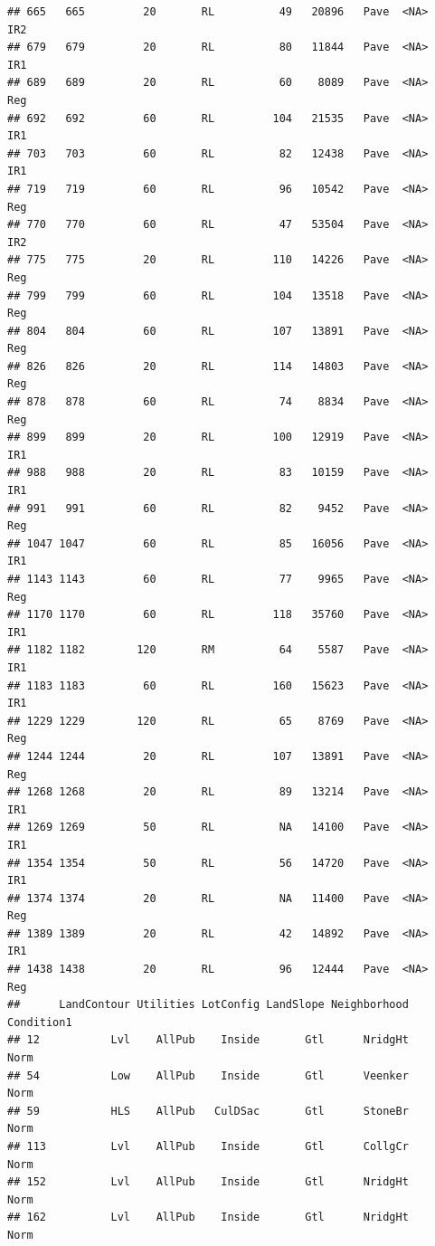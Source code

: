 \documentclass[]{article}
\begin{document}
\begin{verbatim}
## 665   665         20       RL          49   20896   Pave  <NA>      IR2
## 679   679         20       RL          80   11844   Pave  <NA>      IR1
## 689   689         20       RL          60    8089   Pave  <NA>      Reg
## 692   692         60       RL         104   21535   Pave  <NA>      IR1
## 703   703         60       RL          82   12438   Pave  <NA>      IR1
## 719   719         60       RL          96   10542   Pave  <NA>      Reg
## 770   770         60       RL          47   53504   Pave  <NA>      IR2
## 775   775         20       RL         110   14226   Pave  <NA>      Reg
## 799   799         60       RL         104   13518   Pave  <NA>      Reg
## 804   804         60       RL         107   13891   Pave  <NA>      Reg
## 826   826         20       RL         114   14803   Pave  <NA>      Reg
## 878   878         60       RL          74    8834   Pave  <NA>      Reg
## 899   899         20       RL         100   12919   Pave  <NA>      IR1
## 988   988         20       RL          83   10159   Pave  <NA>      IR1
## 991   991         60       RL          82    9452   Pave  <NA>      Reg
## 1047 1047         60       RL          85   16056   Pave  <NA>      IR1
## 1143 1143         60       RL          77    9965   Pave  <NA>      Reg
## 1170 1170         60       RL         118   35760   Pave  <NA>      IR1
## 1182 1182        120       RM          64    5587   Pave  <NA>      IR1
## 1183 1183         60       RL         160   15623   Pave  <NA>      IR1
## 1229 1229        120       RL          65    8769   Pave  <NA>      Reg
## 1244 1244         20       RL         107   13891   Pave  <NA>      Reg
## 1268 1268         20       RL          89   13214   Pave  <NA>      IR1
## 1269 1269         50       RL          NA   14100   Pave  <NA>      IR1
## 1354 1354         50       RL          56   14720   Pave  <NA>      IR1
## 1374 1374         20       RL          NA   11400   Pave  <NA>      Reg
## 1389 1389         20       RL          42   14892   Pave  <NA>      IR1
## 1438 1438         20       RL          96   12444   Pave  <NA>      Reg
##      LandContour Utilities LotConfig LandSlope Neighborhood Condition1
## 12           Lvl    AllPub    Inside       Gtl      NridgHt       Norm
## 54           Low    AllPub    Inside       Gtl      Veenker       Norm
## 59           HLS    AllPub   CulDSac       Gtl      StoneBr       Norm
## 113          Lvl    AllPub    Inside       Gtl      CollgCr       Norm
## 152          Lvl    AllPub    Inside       Gtl      NridgHt       Norm
## 162          Lvl    AllPub    Inside       Gtl      NridgHt       Norm

\end{verbatim}
\end{document}
